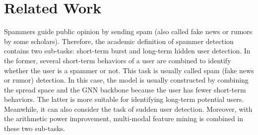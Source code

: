 \section{Related Work}
\par Spammers guide public opinion by sending spam (also called fake news or rumors by some scholars). Therefore, the academic definition of spammer detection contains two sub-tasks: short-term burst and long-term hidden user detection. In the former, several short-term behaviors of a user are combined to identify whether the user is a spammer or not. This task is usually called spam (fake news or rumor) detection. In this case, the model is usually constructed by combining the spread space and the GNN backbone because the user has fewer short-term behaviors. The latter is more suitable for identifying long-term potential users. Meanwhile, it can also consider the task of sudden user detection. Moreover, with the arithmetic power improvement, multi-modal feature mining is combined in these two sub-tasks.
